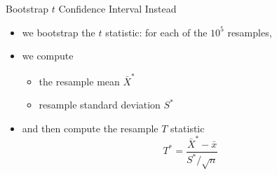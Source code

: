 \documentclass[
  ignorenonframetext,
]{beamer}
\providecommand{\tightlist}{%
  \setlength{\itemsep}{0pt}\setlength{\parskip}{0pt}}
\begin{document}
\begin{frame}{Bootstrap \(t\) Confidence Interval}
\label{bootstrap-t-confidence-interval-3}
Instead

\begin{itemize}
\item
  we bootstrap the \(t\) statistic: for each of the \(10^5\) resamples,
\item
  we compute

  \begin{itemize}
  \tightlist
  \item
    the resample mean \(\bar{X}^*\)
  \item
    resample standard deviation \(S^*\)
  \end{itemize}
\item
  and then compute the resample \(T\) statistic
  \[T^*=\frac{\bar{X}^*-\bar{x}}{S^*/\sqrt{n}}\]
\end{itemize}
\end{frame}
\end{document}
